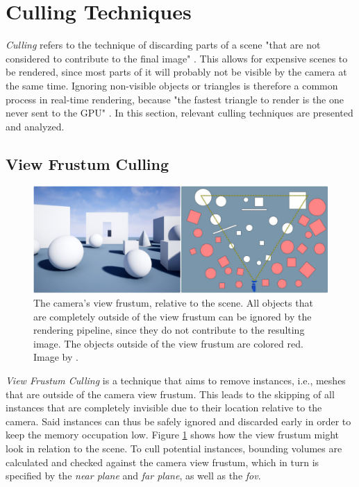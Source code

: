 \section{Culling Techniques} \label{sec-culling-techniques}

\emph{Culling} refers to the technique of discarding parts of a scene "that are not considered to contribute to 
the final image" \cite{AkenineMoeller2018}. This allows for expensive scenes to be rendered, since most parts of it 
will probably not be visible by the camera at the same time. Ignoring non-visible objects or triangles is therefore a 
common process in real-time rendering, because "the fastest triangle to render is the one never sent to the \ac{GPU}" 
\cite{AkenineMoeller2018}. In this section, relevant culling techniques are presented and analyzed. 


\subsection*{View Frustum Culling} \label{subsec-view-frustum-culling}

\begin{figure}[h]
    \centering
    \includegraphics[width=\linewidth]{images/graphics/view-frustum-culling.jpg}
    \caption{The camera's view frustum, relative to the scene. All objects that are completely outside of 
    the view frustum can be ignored by the rendering pipeline, since they do not contribute to the resulting image.
    The objects outside of the view frustum are colored red. Image by \cite{Pan2020}.}
    \label{fig:view-frustum-culling}
\end{figure}

\noindent
\emph{View Frustum Culling} is a technique that aims to remove instances, i.e., meshes that are outside of the camera 
view frustum. This leads to the skipping of all instances that are completely invisible due to their location relative to 
the camera. Said instances can thus be safely ignored and discarded early in order to keep the memory occupation low. 
Figure \ref{fig:view-frustum-culling} shows how the view frustum might look in relation to the scene. 
To cull potential instances, bounding volumes are calculated and checked against the camera view frustum, which in turn 
is specified by the \emph{near plane} and \emph{far plane}, as well as the \emph{fov}. \\

